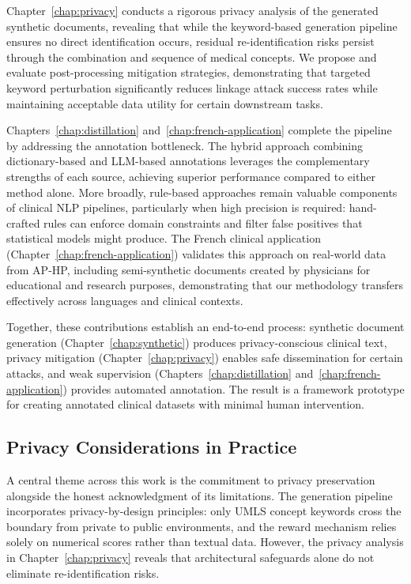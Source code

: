 Chapter~\ref{chap:privacy} conducts a rigorous privacy analysis of the generated synthetic documents, revealing that while the keyword-based generation pipeline ensures no direct identification occurs, residual re-identification risks persist through the combination and sequence of medical concepts.
We propose and evaluate post-processing mitigation strategies, demonstrating that targeted keyword perturbation significantly reduces linkage attack success rates while maintaining acceptable data utility for certain downstream tasks.

Chapters~\ref{chap:distillation} and~\ref{chap:french-application} complete the pipeline by addressing the annotation bottleneck.
The hybrid approach combining dictionary-based and LLM-based annotations leverages the complementary strengths of each source, achieving superior performance compared to either method alone.
More broadly, rule-based approaches remain valuable components of clinical NLP pipelines, particularly when high precision is required: hand-crafted rules can enforce domain constraints and filter false positives that statistical models might produce.
The French clinical application (Chapter~\ref{chap:french-application}) validates this approach on real-world data from AP-HP, including semi-synthetic documents created by physicians for educational and research purposes, demonstrating that our methodology transfers effectively across languages and clinical contexts.

Together, these contributions establish an end-to-end process: synthetic document generation (Chapter~\ref{chap:synthetic}) produces privacy-conscious clinical text, privacy mitigation (Chapter~\ref{chap:privacy}) enables safe dissemination for certain attacks, and weak supervision (Chapters~\ref{chap:distillation} and~\ref{chap:french-application}) provides automated annotation.
The result is a framework prototype for creating annotated clinical datasets with minimal human intervention.

\subsection{Privacy Considerations in Practice}

A central theme across this work is the commitment to privacy preservation alongside the honest acknowledgment of its limitations.
The generation pipeline incorporates privacy-by-design principles: only UMLS concept keywords cross the boundary from private to public environments, and the reward mechanism relies solely on numerical scores rather than textual data.
However, the privacy analysis in Chapter~\ref{chap:privacy} reveals that architectural safeguards alone do not eliminate re-identification risks.

